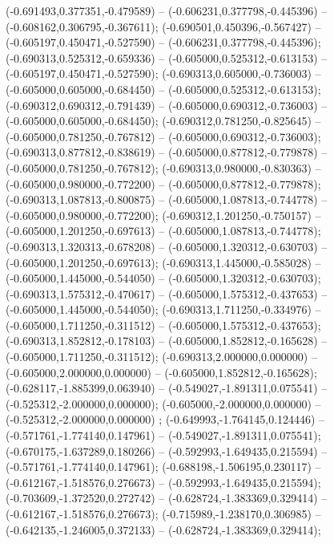  (-0.691493,0.377351,-0.479589) -- (-0.606231,0.377798,-0.445396) -- (-0.608162,0.306795,-0.367611);
 (-0.690501,0.450396,-0.567427) -- (-0.605197,0.450471,-0.527590) -- (-0.606231,0.377798,-0.445396);
 (-0.690313,0.525312,-0.659336) -- (-0.605000,0.525312,-0.613153) -- (-0.605197,0.450471,-0.527590);
 (-0.690313,0.605000,-0.736003) -- (-0.605000,0.605000,-0.684450) -- (-0.605000,0.525312,-0.613153);
 (-0.690312,0.690312,-0.791439) -- (-0.605000,0.690312,-0.736003) -- (-0.605000,0.605000,-0.684450);
 (-0.690312,0.781250,-0.825645) -- (-0.605000,0.781250,-0.767812) -- (-0.605000,0.690312,-0.736003);
 (-0.690313,0.877812,-0.838619) -- (-0.605000,0.877812,-0.779878) -- (-0.605000,0.781250,-0.767812);
 (-0.690313,0.980000,-0.830363) -- (-0.605000,0.980000,-0.772200) -- (-0.605000,0.877812,-0.779878);
 (-0.690313,1.087813,-0.800875) -- (-0.605000,1.087813,-0.744778) -- (-0.605000,0.980000,-0.772200);
 (-0.690312,1.201250,-0.750157) -- (-0.605000,1.201250,-0.697613) -- (-0.605000,1.087813,-0.744778);
 (-0.690313,1.320313,-0.678208) -- (-0.605000,1.320312,-0.630703) -- (-0.605000,1.201250,-0.697613);
 (-0.690313,1.445000,-0.585028) -- (-0.605000,1.445000,-0.544050) -- (-0.605000,1.320312,-0.630703);
 (-0.690313,1.575312,-0.470617) -- (-0.605000,1.575312,-0.437653) -- (-0.605000,1.445000,-0.544050);
 (-0.690313,1.711250,-0.334976) -- (-0.605000,1.711250,-0.311512) -- (-0.605000,1.575312,-0.437653);
 (-0.690313,1.852812,-0.178103) -- (-0.605000,1.852812,-0.165628) -- (-0.605000,1.711250,-0.311512);
 (-0.690313,2.000000,0.000000) -- (-0.605000,2.000000,0.000000) -- (-0.605000,1.852812,-0.165628);
 (-0.628117,-1.885399,0.063940) -- (-0.549027,-1.891311,0.075541) -- (-0.525312,-2.000000,0.000000);
 (-0.605000,-2.000000,0.000000) -- (-0.525312,-2.000000,0.000000) ;
 (-0.649993,-1.764145,0.124446) -- (-0.571761,-1.774140,0.147961) -- (-0.549027,-1.891311,0.075541);
 (-0.670175,-1.637289,0.180266) -- (-0.592993,-1.649435,0.215594) -- (-0.571761,-1.774140,0.147961);
 (-0.688198,-1.506195,0.230117) -- (-0.612167,-1.518576,0.276673) -- (-0.592993,-1.649435,0.215594);
 (-0.703609,-1.372520,0.272742) -- (-0.628724,-1.383369,0.329414) -- (-0.612167,-1.518576,0.276673);
 (-0.715989,-1.238170,0.306985) -- (-0.642135,-1.246005,0.372133) -- (-0.628724,-1.383369,0.329414);
